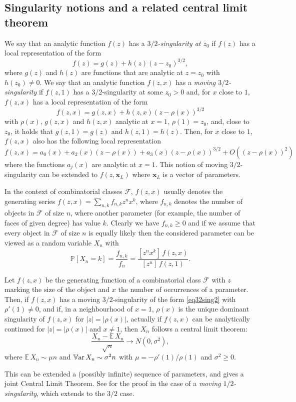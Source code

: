 \documentclass[a4paper,UKenglish,cleveref, autoref, thm-restate]{lipics-v2021}
\renewcommand{\(}{\left(}
\renewcommand{\)}{\right)}
\newcommand{\subfamily}{_L}
\newcommand{\x}{\mathbf{x}\subfamily}
\begin{document}
\subsection{Singularity notions and a related central limit theorem}
We say that an analytic function $f(z)$ has a \emph{$3/2$-singularity at $z_0$} if $f(z)$ has a local representation of the form
\begin{equation}\label{eq32sing}
    f(z) = g(z) + h(z) (z-z_0)^{3/2},
\end{equation}
where $g(z)$ and $h(z)$ are functions that are analytic at $z=z_0$ with $h(z_0) \ne 0$. We say that an analytic function $f(z,x)$ has a \emph{moving $3/2$-singularity} if $f(z,1)$ has a $3/2$-singularity at some $z_0>0$ and, for $x$ close to $1$, $f(z,x)$ has a local representation of the form
\begin{equation}\label{eq32sing2}
f(z,x) = g(z,x) + h(z,x) (z - \rho(x))^{3/2}
\end{equation}
with $\rho(x)$, $g(z,x)$ and $h(z,x)$ analytic at $x=1$, $\rho(1) = z_0$, and, close to $z_0$, it holds that $g(z,1) = g(z)$ and $h(z,1) = h(z)$. Then, for $x$ close to $1$, $f(z,x)$ also has the following local representation
\[f(z,x) = a_0(x) + a_2(x)\(z - \rho(x)\) + a_3(x)\(z - \rho(x)\)^{3/2} + O\(\(z - \rho(x)\)^{2}\)\]
where the functions $a_j(x)$ are analytic at $x = 1$. This notion of moving $3/2$-singularity can be extended to $f(z,\x)$ where $\x$ is a vector of parameters.

In the context of combinatorial classes $\mathcal{F}$, $f(z,x)$ usually denotes the 
generating series $f(z,x) = \sum_{n,k} f_{n,k} z^n x^k$, where $f_{n,k}$ denotes the number
of objects in $\mathcal{F}$ of size $n$, where another parameter (for example, the number
of faces of given degree) has value $k$. Clearly we have $f_{n,k} \ge 0$ and if we assume that
every object in $\mathcal{F}$ of size $n$ is equally likely then the considered parameter
can be viewed as a random variable $X_n$ with 
\[
\mathbb{P}[X_n = k] = \frac{f_{n,k}}{f_n} = \frac{[z^n x^k]\, f(z,x) }{[z^n]\, f(z,1)}.
\]

\begin{proposition}
\label{Pro0}
Let $f(z,x)$ be the generating function of a combinatorial class $\mathcal{F}$ with $z$ marking the size of the object and $x$ the number of occurrences of a parameter. Then, if $f(z,x)$ has a moving $3/2$-singularity
of the form \cref{eq32sing2} with $\rho'(1) \ne 0$, and if, in a neighbourhood of $x=1$, $\rho(x)$ is the unique dominant singularity of $f(z,x)$ for $|z|= |\rho(x)|$, actually if $f(z,x)$ can be
analytically continued for $|z| = |\rho(x)|$ and $x\ne 1$, then 
$X_n$ follows a central limit theorem:
\[
\frac{X_n - \mathbb{E}\, X_n}{\sqrt{n} } \to N(0,\sigma^2),
\]
where $\mathbb{E}\, X_n \sim \mu n$ and $\mathbb{V}{\rm ar}\, X_n \sim \sigma^2 n$ 
with $\mu =  - {\rho'(1)}/{\rho(1)}$ and $\sigma^2 \ge 0$.
\end{proposition}
This can be extended a (possibly infinite) sequence of parameters, and gives a joint Central Limit Theorem. See \cite[\S 2]{Drmota09} for the proof in the case of a \emph{moving $1/2$-singularity}, which extends to the $3/2$ case.
\end{document}
